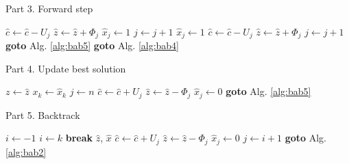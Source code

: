 \documentclass{article}
\begin{document}
    \begin{algorithm}
      \caption{Part 3. Forward step} \label{alg:bab3}
      \begin{algorithmic}[1]
          \State $\hat{c} \gets \hat{c} - U_j$
          \State $\hat{z} \gets \hat{z} + \Phi_j$
          \State $\hat{x}_j \gets 1$
          \State $j \gets j + 1$
        \EndWhile
          \State $\hat{x}_j \gets 1$
          \State $\hat{c} \gets \hat{c} - U_j$
          \State $\hat{z} \gets \hat{z} + \Phi_j$
          \State $j \gets j + 1$
        \EndIf
          \State \textbf{goto} Alg. \ref{alg:bab5}
        \EndIf
        \State \textbf{goto} Alg. \ref{alg:bab4}
      \end{algorithmic}
    \end{algorithm}

    \begin{algorithm}
      \caption{Part 4. Update best solution} \label{alg:bab4}
      \begin{algorithmic}[1]
          \State $z \gets \hat{z}$
            \State $x_k \gets \hat{x}_k$
          \EndFor
        \EndIf
        \State $j \gets n$
          \State $\hat{c} \gets \hat{c} + U_j$
          \State $\hat{z} \gets \hat{z} - \Phi_j$
          \State $\hat{x}_j \gets 0$
        \EndIf
        \State \textbf{goto} Alg. \ref{alg:bab5}
      \end{algorithmic}
    \end{algorithm}

    \begin{algorithm}
      \caption{Part 5. Backtrack} \label{alg:bab5}
      \begin{algorithmic}[1]
        \State $i \gets -1$
            \State $i \gets k$
            \State \textbf{break}
          \EndIf
        \EndFor
          \State \Return $\hat{z}$, $\hat{x}$
        \EndIf
        \State $\hat{c} \gets \hat{c} + U_j$
        \State $\hat{z} \gets \hat{z} - \Phi_j$
        \State $\hat{x}_j \gets 0$
        \State $j \gets i + 1$
        \State \textbf{goto} Alg. \ref{alg:bab2}
      \end{algorithmic}
    \end{algorithm}

  
\end{document}
